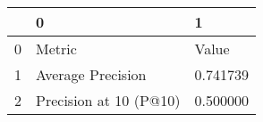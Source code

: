 \begin{tabular}{lll}
\toprule
 & 0 & 1 \\
\midrule
0 & Metric & Value \\
1 & Average Precision & 0.741739 \\
2 & Precision at 10 (P@10) & 0.500000 \\
\bottomrule
\end{tabular}
